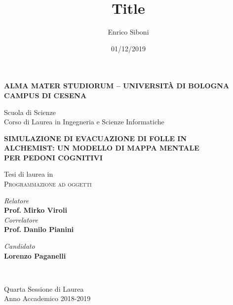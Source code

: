 \title{Title}
\author{Enrico Siboni}
\date{01/12/2019}

\begin{titlepage}
	\begin{center}
		
		\large
		\textbf{ALMA MATER STUDIORUM -- UNIVERSITÀ DI BOLOGNA \\ CAMPUS DI CESENA}
		\\
		\noindent\hrulefill
		\vspace{0.4cm}
		
		\Large
		Scuola di Scienze \\
		Corso di Laurea in Ingegneria e Scienze Informatiche
		
		\vspace{4cm}
		\begin{center}
		{\large{\bf 
		    SIMULAZIONE DI EVACUAZIONE DI FOLLE IN \vspace{1.5mm} \\
		    ALCHEMIST: UN MODELLO DI MAPPA MENTALE \\ 
		    PER PEDONI COGNITIVI
	    }}\\
        \end{center}
        
		
		\large
		\vspace{1cm}
		Tesi di laurea in 
		\\
		\textsc{Programmazione ad oggetti}
		
		\vspace{5.5cm}
		\begin{minipage}[t]{0.64\textwidth}
			\begin{flushleft}
				\textit{Relatore} 
				\\ 
				\textbf{Prof.} \textbf{Mirko Viroli}
				\\
				\vspace{0.4cm}
				\textit{Correlatore} 
				\\
				\textbf{Prof.} \textbf{Danilo Pianini}
			\end{flushleft}
		\end{minipage}
		\begin{minipage}[t]{0.34\textwidth}
			\begin{flushright}
				\textit{Candidato} 
				\\ 
				\textbf{Lorenzo Paganelli}
			\end{flushright}
		\end{minipage}\\
		
		\vfill
		\noindent\hrulefill
		\vspace{0.3cm}
		\Large
		
		Quarta Sessione di Laurea
		\\
		Anno Accademico 2018-2019
	\end{center}
\end{titlepage}
\restoregeometry